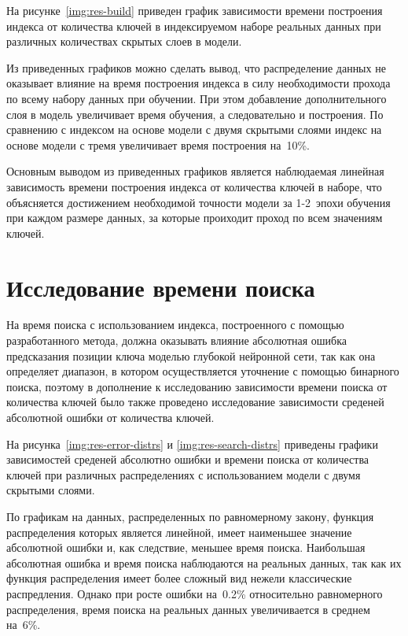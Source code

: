 На рисунке~\ref{img:res-build} приведен график зависимости времени построения
индекса от количества ключей в индексируемом наборе реальных данных при
различных количествах скрытых слоев в модели.


Из приведенных графиков можно сделать вывод, что распределение данных не
оказывает влияние на время построения индекса в силу необходимости прохода по
всему набору данных при обучении. При этом добавление дополнительного слоя в
модель увеличивает время обучения, а следовательно и построения. По сравнению с
индексом на основе модели с двумя скрытыми слоями индекс на основе модели с
тремя увеличивает время построения на~10\%.

Основным выводом из приведенных графиков является наблюдаемая линейная
зависимость времени построения индекса от количества ключей в наборе, что
объясняется достижением необходимой точности модели за \mbox{1-2~эпохи} обучения
при каждом размере данных, за которые проиходит проход по всем значениям ключей.

\section{Исследование времени поиска}

На время поиска с использованием индекса, построенного с помощью разработанного
метода, должна оказывать влияние абсолютная ошибка предсказания позиции ключа
моделью глубокой нейронной сети, так как она определяет диапазон, в котором
осуществляется уточнение с помощью бинарного поиска, поэтому в дополнение к
исследованию зависимости времени поиска от количества ключей было также
проведено исследование зависимости среденей абсолютной ошибки от количества
ключей.

На рисунка~\ref{img:res-error-distrs} и \ref{img:res-search-distrs} приведены
графики зависимостей среденей абсолютно ошибки и времени поиска от количества
ключей при различных распределениях с использованием модели с двумя скрытыми
слоями.



По графикам на данных, распределенных по равномерному закону, функция
распределения которых является линейной, имеет наименьшее значение абсолютной
ошибки и, как следствие, меньшее время поиска. Наибольшая абсолютная ошибка и
время поиска наблюдаются на реальных данных, так как их функция распределения
имеет более сложный вид нежели классические распредления. Однако при росте
ошибки на~0.2\% относительно равномерного распределения, время поиска на
реальных данных увеличивается в среднем на~6\%.

